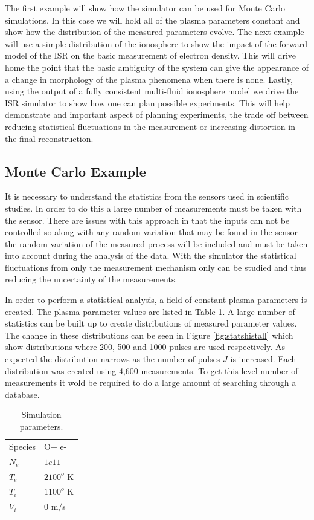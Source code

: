 \documentclass[draft,ras]{agutex}
\begin{document}
\begin{article}
The first example will show how the simulator can be used for Monte Carlo simulations. In this case we will hold all of the plasma parameters constant and show how the distribution of the measured parameters evolve. The next example will use a simple distribution of the ionosphere to show the impact of the forward model of the ISR on the basic measurement of electron density. This will drive home the point that the basic ambiguity of the system can give the appearance of a change in morphology of the plasma phenomena when there is none. Lastly, using the output of a fully consistent multi-fluid ionosphere model we drive the ISR simulator to show how one can plan possible experiments. This will help demonstrate and important aspect of planning experiments, the trade off between reducing statistical fluctuations in the measurement or increasing distortion in the final reconstruction.

\subsection{Monte Carlo Example}
It is necessary to understand the statistics from the sensors used in scientific studies. In order to do this a large number of measurements must be taken with the sensor. There are issues with this approach in that the inputs can not be controlled so along with any random variation that may be found in the sensor the random variation of the measured process will be included and must be taken into account during the analysis of the data. With the simulator the statistical fluctuations from only the measurement mechanism only can be studied and thus reducing the uncertainty of the measurements.

In order to perform a statistical analysis, a field of constant plasma parameters is created. The plasma parameter values are listed in Table \ref{tb:param1}. A large number of statistics can be built up to create distributions of measured parameter values. The change in these distributions can be seen in Figure \ref{fig:statshistall} which show distributions where 200, 500 and 1000 pulses are used respectively. As expected the distribution narrows as the number of pulses $J$ is increased. Each distribution was created using 4,600 measurements. To get this level number of measurements it wold be required to do a large amount of searching through a database. 

\begin{table}[!t]
\centering
\caption{Simulation parameters.}
\label{tb:param1}
\begin{tabular}{ll}
Species & O+ e-\\
$N_e$    & $1e11$ \\
$T_e$      & $2100^o$ K   \\
$T_i$      & $1100^o$ K \\
$V_i$      & $0$ m/s
\end{tabular}
\end{table}


\end{article}
\end{document}
